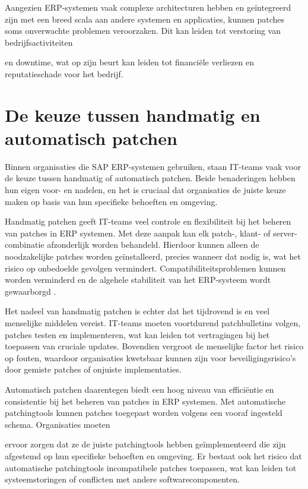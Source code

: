 Aangezien ERP-systemen vaak complexe architecturen hebben en geïntegreerd zijn met een breed scala aan andere systemen en applicaties, kunnen patches soms onverwachte problemen veroorzaken. Dit kan leiden tot verstoring van bedrijfsactiviteiten 

en downtime, wat op zijn beurt kan leiden tot financiële verliezen en reputatieschade voor het bedrijf.


\section{De keuze tussen handmatig en automatisch patchen}

Binnen organisaties die SAP ERP-systemen gebruiken, staan IT-teams vaak voor de keuze tussen handmatig of automatisch patchen. Beide benaderingen hebben hun eigen voor- en nadelen, en het is cruciaal dat organisaties de juiste keuze maken op basis van hun specifieke behoeften en omgeving.

Handmatig patchen geeft IT-teams veel controle en flexibiliteit bij het beheren van patches in ERP systemen. Met deze aanpak kan elk patch-, klant- of server-combinatie afzonderlijk worden behandeld. Hierdoor kunnen alleen de 
noodzakelijke patches worden geïnstalleerd, precies wanneer dat nodig is, wat het risico op onbedoelde gevolgen vermindert. Compatibiliteitsproblemen kunnen worden verminderd en de algehele stabiliteit van het ERP-systeem wordt gewaarborgd \autocite{Hooper2018}.

Het nadeel van handmatig patchen is echter dat het tijdrovend is en veel menselijke middelen vereist. IT-teams moeten voortdurend patchbulletins volgen, patches testen en implementeren, wat kan leiden tot vertragingen bij het 
toepassen van cruciale updates. Bovendien vergroot de menselijke factor het risico op fouten, waardoor organisaties kwetsbaar kunnen zijn voor beveiligingsrisico’s door gemiste patches of onjuiste implementaties.

Automatisch patchen daarentegen biedt een hoog niveau van efficiëntie en consistentie bij het beheren van patches in ERP systemen. Met automatische patchingtools kunnen patches toegepast worden volgens een vooraf ingesteld schema. Organisaties moeten

ervoor zorgen dat ze de juiste patchingtools hebben geïmplementeerd die zijn afgestemd op hun specifieke behoeften en omgeving. Er bestaat ook het risico dat automatische patchingtools incompatibele patches toepassen, wat kan leiden tot systeemstoringen of conflicten met andere softwarecomponenten.

